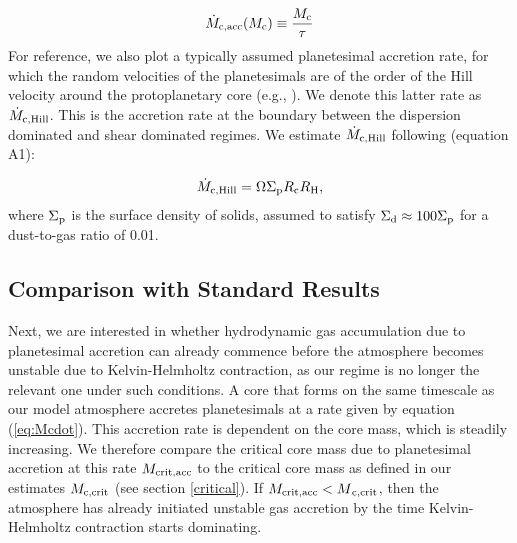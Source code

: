 \documentclass[apj]{emulateapj}
\newcommand{\co}{_{\rm c}}
\newcommand{\di}{_{\rm d}}
\begin{document}
\begin{equation}
\label{eq:Mcdot}
\dot{M}_{\rm{c,acc}}(M_{\rm{c}}) \equiv \frac{M_{\rm{c}}}{\tau}
\end{equation}
For reference, we also plot a typically assumed planetesimal accretion rate, for which the random velocities of the planetesimals are of the order of the Hill velocity around the protoplanetary core (e.g., \citealt{goldreich04}). We denote this latter rate as $\dot{M}_{\rm{c,Hill}}$. This is the accretion rate at the boundary between the dispersion dominated and shear dominated regimes. We estimate $\dot{M}_{\rm{c,Hill}}$ following \citet{rafikov06} (equation A1):

\begin{equation}
\label{eq:MdotHill}
\dot{M}_{\rm{c,Hill}}=\Omega \Sigma_{\rm p} R\co R_{\rm H},
\end{equation}
where $\Sigma_{\rm p}$ is the surface density of solids, assumed to satisfy $\Sigma\di \approx 100 \Sigma_{\rm p}$ for a dust-to-gas ratio of 0.01.



\subsection{Comparison with Standard Results}
\label{raf2}

Next, we are interested in whether hydrodynamic gas accumulation due to planetesimal accretion can already commence before the atmosphere becomes unstable due to Kelvin-Helmholtz contraction, as our regime is no longer the relevant one under such conditions. A core that forms on the same timescale as our model atmosphere accretes planetesimals at a rate given by equation (\ref{eq:Mcdot}). This accretion rate is dependent on the core mass, which is steadily increasing. We therefore compare the critical core mass due to planetesimal accretion at this rate $M_{\rm{crit,acc}}$ to the critical core mass as defined in our estimates $M_{\rm{c,crit}}$ (see section \ref{critical}). If $M_{\rm{crit,acc}}<M{\rm_{c, crit}}$, then the atmosphere has already initiated unstable gas accretion by the time Kelvin-Helmholtz contraction starts dominating. 
\end{document}
